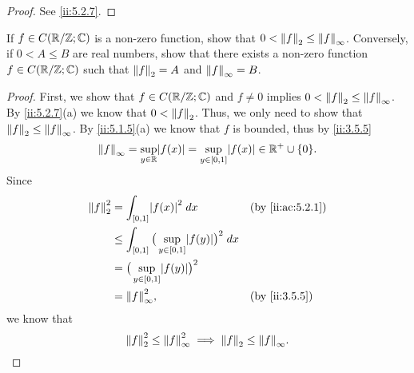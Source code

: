 \begin{proof}
  See \cref{ii:5.2.7}.
\end{proof}

\begin{ex}\label{ii:ex:5.2.3}
  If \(f \in C(\R / \Z ; \C)\) is a non-zero function, show that \(0 < \norm*{f}_2 \leq \norm*{f}_\infty\).
  Conversely, if \(0 < A \leq B\) are real numbers, show that there exists a non-zero function \(f \in C(\R / \Z ; \C)\) such that \(\norm*{f}_2 = A\) and \(\norm*{f}_\infty = B\).
\end{ex}

\begin{proof}
  First, we show that \(f \in C(\R / \Z ; \C)\) and \(f \neq 0\) implies \(0 < \norm*{f}_2 \leq \norm*{f}_{\infty}\).
  By \cref{ii:5.2.7}(a) we know that \(0 < \norm*{f}_2\).
  Thus, we only need to show that \(\norm*{f}_2 \leq \norm*{f}_\infty\).
  By \cref{ii:5.1.5}(a) we know that \(f\) is bounded, thus by \cref{ii:3.5.5}
  \[
    \norm*{f}_{\infty} = \sup_{y \in \R} \abs{f(x)} = \sup_{y \in [0, 1]} \abs{f(x)} \in \R^+ \cup \set{0}.
  \]
  Since
  \begin{align*}
    \norm*{f}_2^2 & = \int_{[0, 1]} \abs{f(x)}^2 \; dx                                  &  & \by{ii:ac:5.2.1} \\
                  & \leq \int_{[0, 1]} \big(\sup_{y \in [0, 1]} \abs{f(y)}\big)^2 \; dx                       \\
                  & = \big(\sup_{y \in [0, 1]} \abs{f(y)}\big)^2                                              \\
                  & = \norm*{f}_{\infty}^2,                                             &  & \by{ii:3.5.5}
  \end{align*}
  we know that
  \[
    \norm*{f}_2^2 \leq \norm*{f}_{\infty}^2 \implies \norm*{f}_2 \leq \norm*{f}_{\infty}.
  \]


\end{proof}
